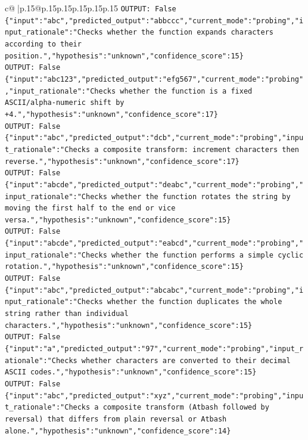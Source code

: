 \documentclass{article}
\begin{document}
{\begin{supertabular}{c@{$\;$}|p{.15\linewidth}@{}p{.15\linewidth}p{.15\linewidth}p{.15\linewidth}p{.15\linewidth}p{.15\linewidth}}
{{{\texttt{OUTPUT: False} \\
\texttt{\{"input":"abc","predicted\_output":"abbccc","current\_mode":"probing","input\_rationale":"Checks whether the function expands characters according to their position.","hypothesis":"unknown","confidence\_score":15\}} \\
\texttt{OUTPUT: False} \\
\texttt{\{"input":"abc123","predicted\_output":"efg567","current\_mode":"probing","input\_rationale":"Checks whether the function is a fixed ASCII/alpha{-}numeric shift by +4.","hypothesis":"unknown","confidence\_score":17\}} \\
\texttt{OUTPUT: False} \\
\texttt{\{"input":"abc","predicted\_output":"dcb","current\_mode":"probing","input\_rationale":"Checks a composite transform: increment characters then reverse.","hypothesis":"unknown","confidence\_score":17\}} \\
\texttt{OUTPUT: False} \\
\texttt{\{"input":"abcde","predicted\_output":"deabc","current\_mode":"probing","input\_rationale":"Checks whether the function rotates the string by moving the first half to the end or vice versa.","hypothesis":"unknown","confidence\_score":15\}} \\
\texttt{OUTPUT: False} \\
\texttt{\{"input":"abcde","predicted\_output":"eabcd","current\_mode":"probing","input\_rationale":"Checks whether the function performs a simple cyclic rotation.","hypothesis":"unknown","confidence\_score":15\}} \\
\texttt{OUTPUT: False} \\
\texttt{\{"input":"abc","predicted\_output":"abcabc","current\_mode":"probing","input\_rationale":"Checks whether the function duplicates the whole string rather than individual characters.","hypothesis":"unknown","confidence\_score":15\}} \\
\texttt{OUTPUT: False} \\
\texttt{\{"input":"a","predicted\_output":"97","current\_mode":"probing","input\_rationale":"Checks whether characters are converted to their decimal ASCII codes.","hypothesis":"unknown","confidence\_score":15\}} \\
\texttt{OUTPUT: False} \\
\texttt{\{"input":"abc","predicted\_output":"xyz","current\_mode":"probing","input\_rationale":"Checks a composite transform (Atbash followed by reversal) that differs from plain reversal or Atbash alone.","hypothesis":"unknown","confidence\_score":14\}} \\
}}}
\end{supertabular}}
\end{document}
